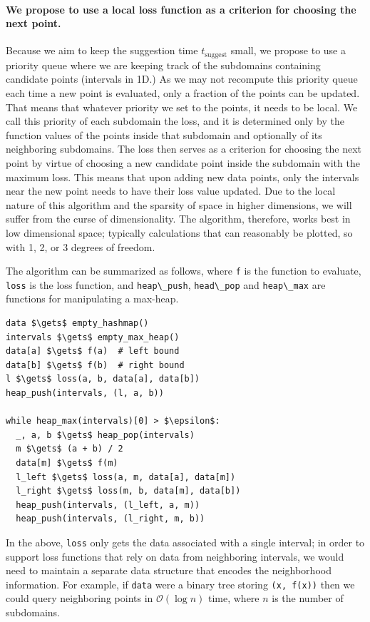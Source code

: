 \documentclass[english, twocolumn, 10pt, aps, superscriptaddress, floatfix, prb, citeautoscript]{revtex4-1}
\newcommand{\passthrough}[1]{\lstset{mathescape=false}#1\lstset{mathescape=true}}
\begin{document}
\paragraph{We propose to use a local loss function as a criterion for choosing the next point.}

Because we aim to keep the suggestion time \(t_\textrm{suggest}\) small, we propose to use a priority queue where we are keeping track of the subdomains containing candidate points (intervals in 1D.)
As we may not recompute this priority queue each time a new point is evaluated, only a fraction of the points can be updated.
That means that whatever priority we set to the points, it needs to be local.
We call this priority of each subdomain the loss, and it is determined only by the function values of the points inside that subdomain and optionally of its neighboring subdomains.
The loss then serves as a criterion for choosing the next point by virtue of choosing a new candidate point inside the subdomain with the maximum loss.
This means that upon adding new data points, only the intervals near the new point needs to have their loss value updated.
Due to the local nature of this algorithm and the sparsity of space in higher dimensions, we will suffer from the curse of dimensionality.
The algorithm, therefore, works best in low dimensional space; typically calculations that can reasonably be plotted, so with 1, 2, or 3 degrees of freedom.

The algorithm can be summarized as follows, where \passthrough{\lstinline!f!} is the function to evaluate, \passthrough{\lstinline!loss!} is the loss function, and \passthrough{\lstinline!heap\_push!}, \passthrough{\lstinline!head\_pop!} and \passthrough{\lstinline!heap\_max!} are functions for manipulating a max-heap.

\begin{lstlisting}
data $\gets$ empty_hashmap()
intervals $\gets$ empty_max_heap()
data[a] $\gets$ f(a)  # left bound
data[b] $\gets$ f(b)  # right bound
l $\gets$ loss(a, b, data[a], data[b])
heap_push(intervals, (l, a, b))

while heap_max(intervals)[0] > $\epsilon$:
  _, a, b $\gets$ heap_pop(intervals)
  m $\gets$ (a + b) / 2
  data[m] $\gets$ f(m)
  l_left $\gets$ loss(a, m, data[a], data[m])
  l_right $\gets$ loss(m, b, data[m], data[b])
  heap_push(intervals, (l_left, a, m))
  heap_push(intervals, (l_right, m, b))
\end{lstlisting}

In the above, \passthrough{\lstinline!loss!} only gets the data associated with a single interval;
in order to support loss functions that rely on data from neighboring intervals, we would need to maintain a separate data structure that encodes the neighborhood information.
For example, if \passthrough{\lstinline!data!} were a binary tree storing \passthrough{\lstinline!(x, f(x))!} then we could query neighboring points in \(\mathcal{O}(\log n)\) time, where \(n\) is the number of subdomains.
\end{document}
